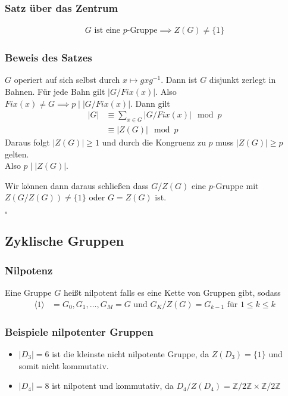 \documentclass[12pt, german]{article}
\newcommand{\bewiesen}{

\begin{flushright}
		$\square$  \\
\end{flushright}}
\begin{document}
\subsubsection{Satz über das Zentrum}
	\begin{align*}
		G \text{ ist eine $p$-Gruppe} \implies Z(G) \not = \{1\}
	\end{align*}

\subsubsection{Beweis des Satzes}
	$G$ operiert auf sich selbst durch $x \mapsto gxg^{-1}$. Dann ist $G$ disjunkt zerlegt in Bahnen. Für jede Bahn gilt $|G/Fix(x)|$. 
	Also $Fix(x) \not= G \implies p \mid |G/Fix(x)|$. Dann gilt 
	\begin{align*}
		|G| &\equiv \sum_{x \in G} |G/Fix(x)|  \mod p\\
		&\equiv |Z(G) |\mod p
	\end{align*}
	Daraus folgt $|Z(G)| \geq 1$ und durch die Kongruenz zu $p$ muss $|Z(G)|\geq p$ gelten. \\
	Also $p \mid |Z(G)|$. 
	\newline
	
	Wir können dann daraus schließen dass $G/Z(G)$ eine $p$-Gruppe mit $Z(G/Z(G)) \not = \{1\}$ oder $G=Z(G)$ ist.
	\bewiesen
	
\subsection{Zyklische Gruppen}
\subsubsection{Nilpotenz}
	Eine Gruppe $G$ heißt nilpotent falls es eine Kette von Gruppen gibt, sodass
	\begin{align*}
		\langle 1 \rangle &= G_0, G_1, \ldots, G_M = G  \text{ und } G_K/Z(G) = G_{k-1} \text{ für } 1 \leq k \leq k
	\end{align*}

\subsubsection{Beispiele nilpotenter Gruppen}
	\begin{itemize}
		\item $|D_3| = 6$ ist die kleinste nicht nilpotente Gruppe, da $Z(D_3) = \{1\}$ und somit nicht kommutativ.
		\item $|D_4| = 8$ ist nilpotent und kommutativ, da $D_4/Z(D_4) = \mathbb Z/2 \mathbb Z \times \mathbb Z /2\mathbb Z$
	\end{itemize}
\end{document}
